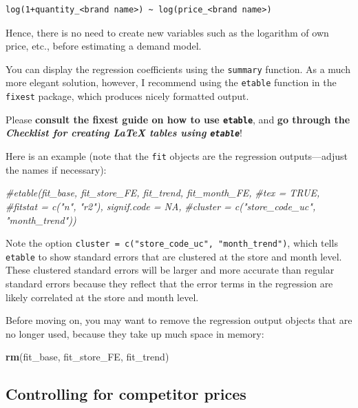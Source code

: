 \documentclass[
]{article}
\newenvironment{Shaded}{\begin{snugshade}}{\end{snugshade}}
\newcommand{\CommentTok}[1]{\textcolor[rgb]{0.56,0.35,0.01}{\textit{#1}}}
\newcommand{\FunctionTok}[1]{\textcolor[rgb]{0.13,0.29,0.53}{\textbf{#1}}}
\newcommand{\NormalTok}[1]{#1}
\begin{document}
\begin{verbatim}
log(1+quantity_<brand name>) ~ log(price_<brand name>)
\end{verbatim}

Hence, there is no need to create new variables such as the logarithm of
own price, etc., before estimating a demand model.

\bigskip

You can display the regression coefficients using the \texttt{summary}
function. As a much more elegant solution, however, I recommend using
the \texttt{etable} function in the \texttt{fixest} package, which
produces nicely formatted output.

Please \textbf{consult the fixest guide on how to use \texttt{etable}},
and \textbf{go through the} \textbf{\emph{Checklist for creating LaTeX
tables using \texttt{etable}}}!

Here is an example (note that the \texttt{fit} objects are the
regression outputs---adjust the names if necessary):

\begin{Shaded}
\begin{Highlighting}[]
\CommentTok{\#etable(fit\_base, fit\_store\_FE, fit\_trend, fit\_month\_FE,}
       \CommentTok{\#tex = TRUE,}
       \CommentTok{\#fitstat = c("n", "r2"), signif.code = NA,}
       \CommentTok{\#cluster = c("store\_code\_uc", "month\_trend"))}
\end{Highlighting}
\end{Shaded}

Note the option
\texttt{cluster\ =\ c("store\_code\_uc",\ "month\_trend")}, which tells
\texttt{etable} to show standard errors that are clustered at the store
and month level. These clustered standard errors will be larger and more
accurate than regular standard errors because they reflect that the
error terms in the regression are likely correlated at the store and
month level.

\bigskip

Before moving on, you may want to remove the regression output objects
that are no longer used, because they take up much space in memory:

\begin{Shaded}
\begin{Highlighting}[]
\FunctionTok{rm}\NormalTok{(fit\_base, fit\_store\_FE, fit\_trend)}
\end{Highlighting}
\end{Shaded}

\subsection{Controlling for competitor
prices}\label{controlling-for-competitor-prices}
\end{document}
